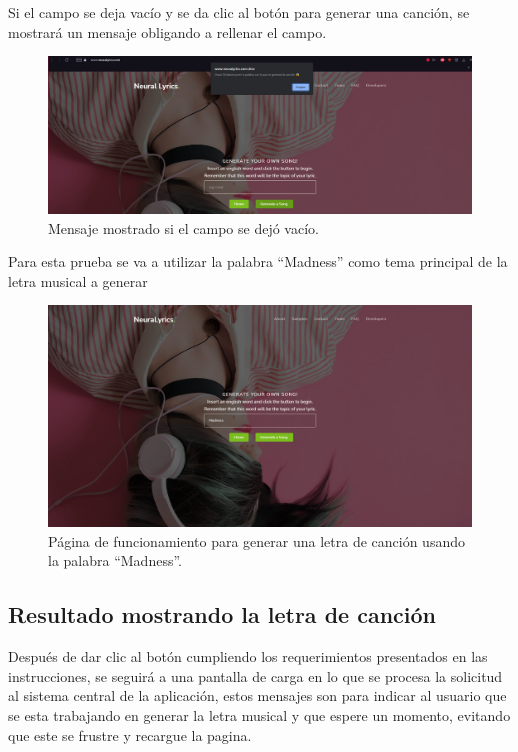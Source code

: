 \documentclass[12pt, a4paper, titlepage]{report}
\begin{document}
Si el campo se deja vacío y se da clic al botón para generar una canción, se mostrará un mensaje obligando a rellenar el campo.

\begin{figure}[H] 
	\includegraphics[width=13.5cm]{./imagenes/Pruebas/Noword.png}
	\centering \caption{Mensaje mostrado si el campo se dejó vacío.}
\end{figure}

Para esta prueba se va a utilizar la palabra ``Madness'' como tema principal de la letra musical a generar

\begin{figure}[H] 
	\includegraphics[width=13.5cm]{./imagenes/Pruebas/Word.png}
	\centering \caption{Página de funcionamiento para generar una letra de canción usando la palabra ``Madness''.}
\end{figure}

\subsection{Resultado mostrando la letra de canción}
Después de dar clic al botón cumpliendo los requerimientos presentados en las instrucciones, se seguirá a una pantalla de carga en lo que se procesa la solicitud al sistema central de la aplicación, estos mensajes son para indicar al usuario que se esta trabajando en generar la letra musical y que espere un momento, evitando que este se frustre y recargue la pagina.
\end{document}
